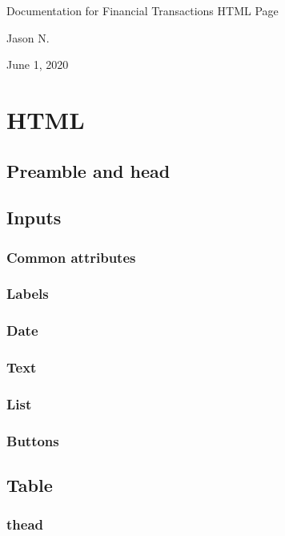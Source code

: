 \documentclass[letterpaper]{article}
\begin{document}
\vspace*{\fill}
\begin{center}
    \Large
    Documentation for Financial Transactions HTML Page

    \large
    Jason N.

    June 1, 2020
\end{center}
\vspace*{\fill}

\newpage
{}
\tableofcontents

\newpage
{}
\parskip 10pt

\section{HTML}\label{HTML}

\subsection{Preamble and head}
\subsection{Inputs}
\subsubsection{Common attributes}
\subsubsection{Labels}
\subsubsection{Date}
\subsubsection{Text}
\subsubsection{List}
\subsubsection{Buttons}
\subsection{Table}
\subsubsection{thead}
\end{document}

